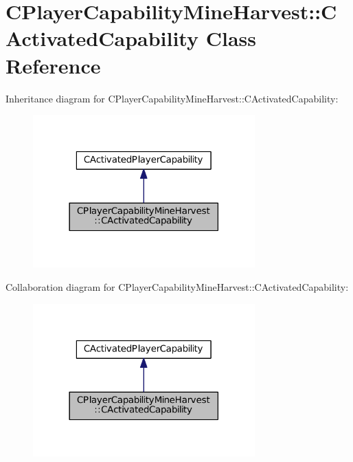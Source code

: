 \hypertarget{classCPlayerCapabilityMineHarvest_1_1CActivatedCapability}{}\section{C\+Player\+Capability\+Mine\+Harvest\+:\+:C\+Activated\+Capability Class Reference}
\label{classCPlayerCapabilityMineHarvest_1_1CActivatedCapability}


Inheritance diagram for C\+Player\+Capability\+Mine\+Harvest\+:\+:C\+Activated\+Capability\+:
\nopagebreak
\begin{figure}[H]
\begin{center}
\leavevmode
\includegraphics[width=242pt]{classCPlayerCapabilityMineHarvest_1_1CActivatedCapability__inherit__graph}
\end{center}
\end{figure}


Collaboration diagram for C\+Player\+Capability\+Mine\+Harvest\+:\+:C\+Activated\+Capability\+:
\nopagebreak
\begin{figure}[H]
\begin{center}
\leavevmode
\includegraphics[width=242pt]{classCPlayerCapabilityMineHarvest_1_1CActivatedCapability__coll__graph}
\end{center}
\end{figure}

